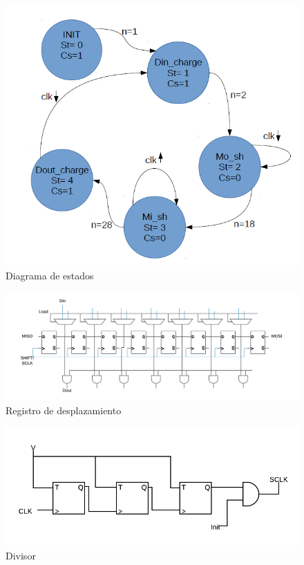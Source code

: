 \documentclass{article}
\begin{document}
\begin{figure}[H]
\centering
\includegraphics[scale=0.65]{d1.PNG}
\caption{Diagrama de estados}
\label{imagen 1}
\end{figure}



\begin{figure}[H]

\includegraphics[scale=0.5]{1.png}
\caption{Registro de desplazamiento}
\label{imagen 1}
\end{figure}

\begin{figure}[H]

\includegraphics[scale=1]{DIV.png}
\caption{Divisor}
\label{imagen 1}
\end{figure}




















\end{document}

